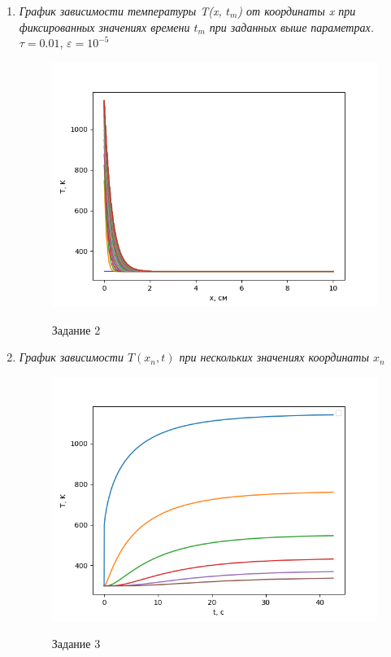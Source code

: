 \begin{enumerate}
	
	\newpage
	\item \textit{График зависимости температуры T(x, $t_m$) от координаты x при фиксированных значениях времени $t_m$ при заданных выше параметрах.}\\
	
	$\tau = 0.01$, $\varepsilon = 10^{-5}$
	
	\begin{figure}[h]
		\begin{center}
			{\includegraphics{../pictures/Figure_1}}
			\caption{Задание 2}
		\end{center}
	\end{figure}

	\item\textit{График зависимости $T(x_n, t)$ при нескольких значениях координаты $x_n$}
	\begin{figure}[h]
		\begin{center}
			{\includegraphics{../pictures/Figure_2}}
			\caption{Задание 3}
		\end{center}
	\end{figure}
	
\end{enumerate}